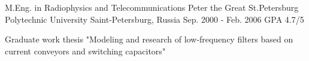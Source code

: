 

\begin{cventries}

  \cventry
    {M.Eng. in Radiophysics and Telecommunications} %
    {Peter the Great St.Petersburg Polytechnic University} %
    {Saint-Petersburg, Russia} %
    {Sep. 2000 - Feb. 2006} %
    {GPA 4.7/5}
    {
      \begin{cvitems} %
        \item {Graduate work thesis "Modeling and research of low‐frequency filters based on current conveyors and switching capacitors"}
      \end{cvitems}
    }

\end{cventries}
